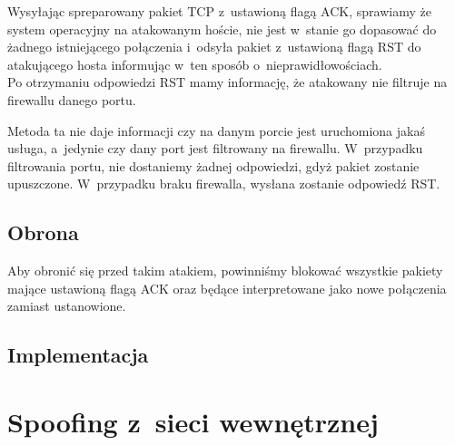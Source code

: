 \documentclass[a4paper,12pt,oneside]{book}
\begin{document}
			Wysyłając spreparowany pakiet TCP z~ustawioną flagą ACK, sprawiamy że system operacyjny na atakowanym hoście, nie jest w~stanie go dopasować do żadnego istniejącego połączenia i~odsyła pakiet z~ustawioną flagą RST do atakującego hosta informując w~ten sposób o~nieprawidłowościach.\\
			Po otrzymaniu odpowiedzi RST mamy informację, że atakowany nie filtruje na firewallu danego portu.

			Metoda ta nie daje informacji czy na danym porcie jest uruchomiona jakaś usługa, a~jedynie czy dany port jest filtrowany na firewallu.
			W~przypadku filtrowania portu, nie dostaniemy żadnej odpowiedzi, gdyż pakiet zostanie upuszczone.
			W~przypadku braku firewalla, wysłana zostanie odpowiedź RST.
		\subsection{Obrona}
			Aby obronić się przed takim atakiem, powinniśmy blokować wszystkie pakiety mające ustawioną flagą ACK oraz będące interpretowane jako nowe połączenia zamiast ustanowione.
		\subsection{Implementacja}
			\footnotesize
			\normalsize
	\section{Spoofing z~sieci wewnętrznej}
\end{document}
